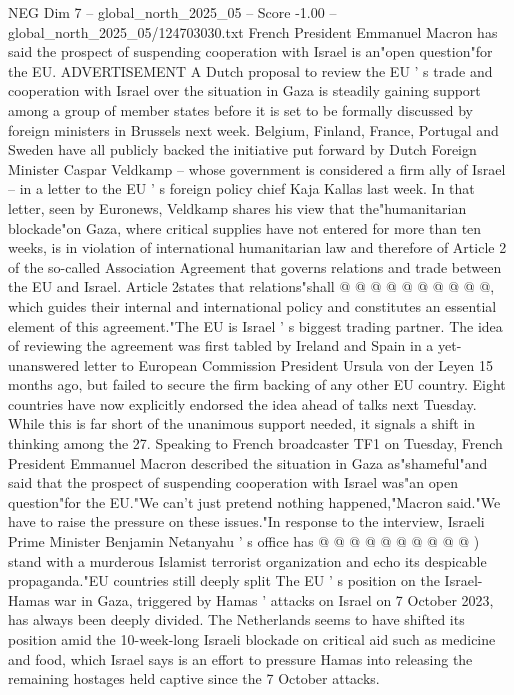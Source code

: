 \begin{textsample}{NEG Dim 7 – global\_north\_2025\_05 – Score -1.00 – global\_north\_2025\_05/124703030.txt}  \label{ex:f7_neg_126}
French President Emmanuel Macron has said the prospect of suspending cooperation with Israel is an"open question"for the EU.
ADVERTISEMENT A Dutch proposal to review the EU ' s trade and cooperation with Israel over the situation in Gaza is steadily gaining support among a group of member states before it is set to be formally discussed by foreign ministers in Brussels next week.
Belgium, Finland, France, Portugal and Sweden have all publicly backed the initiative put forward by Dutch Foreign Minister Caspar Veldkamp -- whose government is considered a firm ally of Israel -- in a letter to the EU ' s foreign policy chief Kaja Kallas last week.
In that letter, seen by Euronews, Veldkamp shares his view that the"humanitarian blockade"on Gaza, where critical supplies have not entered for more than ten weeks, is in violation of international humanitarian law and therefore of Article 2 of the so-called Association Agreement that governs relations and trade between the EU and Israel.
Article 2states that relations"shall @ @ @ @ @ @ @ @ @ @, which guides their internal and international policy and constitutes an essential element of this agreement."The EU is Israel ' s biggest trading partner.
The idea of reviewing the agreement was first tabled by Ireland and Spain in a yet-unanswered letter to European Commission President Ursula von der Leyen 15 months ago, but failed to secure the firm backing of any other EU country.
Eight countries have now explicitly endorsed the idea ahead of talks next Tuesday.
While this is far short of the unanimous support needed, it signals a shift in thinking among the 27.
Speaking to French broadcaster TF1 on Tuesday, French President Emmanuel Macron described the situation in Gaza as"shameful"and said that the prospect of suspending cooperation with Israel was"an open question"for the EU."We can't just pretend nothing happened,"Macron said."We have to raise the pressure on these issues."In response to the interview, Israeli Prime Minister Benjamin Netanyahu ' s office has @ @ @ @ @ @ @ @ @ @ ) stand with a murderous Islamist terrorist organization and echo its despicable propaganda."EU countries still deeply split The EU ' s position on the Israel-Hamas war in Gaza, triggered by Hamas ' attacks on Israel on 7 October 2023, has always been deeply divided.
The Netherlands seems to have shifted its position amid the 10-week-long Israeli blockade on critical aid such as medicine and food, which Israel says is an effort to pressure Hamas into releasing the remaining hostages held captive since the 7 October attacks.

\end{textsample}
